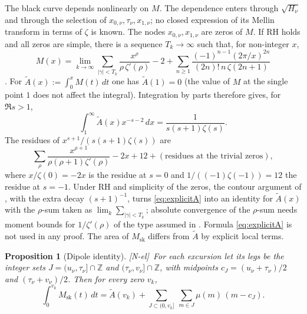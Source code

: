\documentclass[11pt]{amsart}
\numberwithin{equation}{section}
\theoremstyle{plain}
\newtheorem{proposition}[theorem]{Proposition}
\theoremstyle{definition}
\theoremstyle{remark}
\newcommand{\Msk}{M_{\mathrm{sk}}}
\newcommand{\tagNE}{\textup{[N-el]}}
\begin{document}
The black curve depends nonlinearly on $M$. The dependence enters through
$\sqrt{H_\nu}$ and through the selection of
$x_{0,\nu},\tau_\nu,x_{1,\nu}$; no closed expression of its Mellin transform
in terms of $\zeta$ is known. The nodes
$x_{0,\nu},x_{1,\nu}$ are zeros of $M$. If RH holds and all zeros are
simple, there is a sequence $T_k\to\infty$ such that, for non-integer $x$,
\begin{equation}
\label{eq:explicitM}
  M(x)=\lim_{k\to\infty}\sum_{|\gamma|<T_k}\frac{x^\rho}{\rho\,\zeta'(\rho)}-2
  +\sum_{n\ge1}\frac{(-1)^{n-1}(2\pi/x)^{2n}}{(2n)!\,n\,\zeta(2n+1)}
\end{equation}
\cite[\S14.27]{Titchmarsh1986}. For $\widetilde{A}(x):=\int_0^xM(t)\,dt$ one has
$\widetilde A(1)=0$ (the value of $M$ at the single point $1$ does not
affect the integral).  Integration by parts therefore gives, for
$\Re s>1$,
\begin{equation}
\label{eq:mellin_A}
  \int_1^\infty \widetilde{A}(x)x^{-s-2}\,dx=\frac{1}{s(s+1)\zeta(s)}.
\end{equation}
The residues of $x^{s+1}/(s(s+1)\zeta(s))$ are
\begin{equation}
\label{eq:explicitA}
  \sum_\rho\frac{x^{\rho+1}}{\rho(\rho+1)\zeta'(\rho)}-2x+12
  +(\text{residues at the trivial zeros}),
\end{equation}
where $x/\zeta(0)=-2x$ is the residue at $s=0$ and
$1/((-1)\zeta(-1))=12$ the residue at $s=-1$. Under RH and simplicity of the zeros, the contour argument of
\cite[\S14.27]{Titchmarsh1986}, with the extra decay $(s+1)^{-1}$, turns
\eqref{eq:explicitA} into an identity for $\widetilde A(x)$ with the
$\rho$-sum taken as $\lim_k\sum_{|\gamma|<T_k}$; absolute convergence of
the $\rho$-sum needs moment bounds for $1/\zeta'(\rho)$ of the type assumed
in \cite{Ng2004}. Formula \eqref{eq:explicitA} is not used in any proof. The area of $\Msk$ differs from
$\widetilde A$ by explicit local terms.

\begin{proposition}[Dipole identity]
\label{prop:dipoles}
\tagNE\ For each excursion let its \emph{legs} be the integer sets
$J=(u_\nu,\tau_\nu]\cap\mathbb{Z}$ and
$(\tau_\nu,v_\nu]\cap\mathbb{Z}$, with midpoints $c_J=(u_\nu+\tau_\nu)/2$
and $(\tau_\nu+v_\nu)/2$. Then for every zero $v_k$,
\begin{equation}
\label{eq:dipoles}
  \int_0^{v_k}\Msk(t)\,dt=\widetilde{A}(v_k)
  +\sum_{J\subset(0,v_k]}\ \sum_{m\in J}\mu(m)\,(m-c_J).
\end{equation}
\end{proposition}
\end{document}
